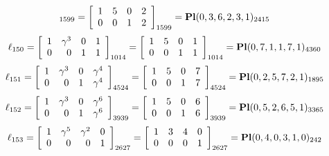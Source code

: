 \documentclass{article}
\begin{document}
{$$_{1599}
=
\left[
\begin{array}{*{4}c}
1  & 5  & 0  & 2\\
0  & 0  & 1  & 2\\
\end{array}
\right]_{1599}
={\rm\bf Pl}(0,3,6,2,3,1 )_{2415}$$
$$
\ell_{150} = 
\left[
\begin{array}{*{4}{r}}
1 & \gamma^{3} & 0 & 1\\
0 & 0 & 1 & 1\\
\end{array}
\right]
_{1014}
=
\left[
\begin{array}{*{4}c}
1  & 5  & 0  & 1\\
0  & 0  & 1  & 1\\
\end{array}
\right]_{1014}
={\rm\bf Pl}(0,7,1,1,7,1 )_{4360}$$
$$
\ell_{151} = 
\left[
\begin{array}{*{4}{r}}
1 & \gamma^{3} & 0 & \gamma^{4}\\
0 & 0 & 1 & \gamma^{4}\\
\end{array}
\right]
_{4524}
=
\left[
\begin{array}{*{4}c}
1  & 5  & 0  & 7\\
0  & 0  & 1  & 7\\
\end{array}
\right]_{4524}
={\rm\bf Pl}(0,2,5,7,2,1 )_{1895}$$
$$
\ell_{152} = 
\left[
\begin{array}{*{4}{r}}
1 & \gamma^{3} & 0 & \gamma^{6}\\
0 & 0 & 1 & \gamma^{6}\\
\end{array}
\right]
_{3939}
=
\left[
\begin{array}{*{4}c}
1  & 5  & 0  & 6\\
0  & 0  & 1  & 6\\
\end{array}
\right]_{3939}
={\rm\bf Pl}(0,5,2,6,5,1 )_{3365}$$
$$
\ell_{153} = 
\left[
\begin{array}{*{4}{r}}
1 & \gamma^{5} & \gamma^{2} & 0\\
0 & 0 & 0 & 1\\
\end{array}
\right]
_{2627}
=
\left[
\begin{array}{*{4}c}
1  & 3  & 4  & 0\\
0  & 0  & 0  & 1\\
\end{array}
\right]_{2627}
={\rm\bf Pl}(0,4,0,3,1,0 )_{242}$$
}
\end{document}

